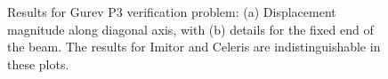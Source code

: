\begin{figure}[ht!]
{\label{fig:gure3-2}}		
%
\caption{Results for Gurev P3 verification problem: (a) Displacement magnitude along diagonal axis, with (b) details for the fixed end of the beam. The results for Imitor and Celeris are indistinguishable in these plots.}
\label{fig:gurev3}
\end{figure}
\begin{figure}[ht!]
\centering
{}		
\subfigure[]{%
}
\end{figure}
